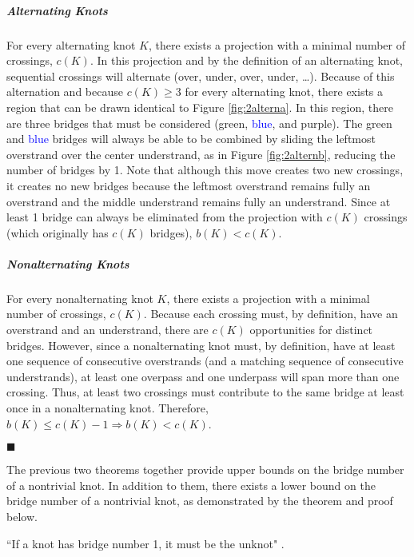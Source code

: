 \documentclass[titlepage]{article}
\newcommand{\dq}[4][]{``#2"#1 \cite[#4]{#3}.}
\newcommand{\qed}{
    \begin{flushright}
        $\blacksquare$
    \end{flushright}
}
\begin{document}
\subparagraph{\textbf{Alternating Knots}} For every alternating knot $K$, there exists a projection with a minimal number of crossings, $c(K)$. In this projection and by the definition of an alternating knot, sequential crossings will alternate (over, under, over, under, \dots). Because of this alternation and because $c(K)\geq 3$ for every alternating knot, there exists a region that can be drawn identical to Figure \ref{fig:2alterna}. In this region, there are three bridges that must be considered (\textcolor{grx}{green}, \textcolor{blue}{blue}, and \textcolor{pux}{purple}). The \textcolor{grx}{green} and \textcolor{blue}{blue} bridges will always be able to be combined by sliding the leftmost overstrand over the center understrand, as in Figure \ref{fig:2alternb}, reducing the number of bridges by 1. Note that although this move creates two new crossings, it creates no new bridges because the leftmost overstrand remains fully an overstrand and the middle understrand remains fully an understrand. Since at least 1 bridge can always be eliminated from the projection with $c(K)$ crossings (which originally has $c(K)$ bridges), $b(K)<c(K)$.
\subparagraph{\textbf{Nonalternating Knots}} For every nonalternating knot $K$, there exists a projection with a minimal number of crossings, $c(K)$. Because each crossing must, by definition, have an overstrand and an understrand, there are $c(K)$ opportunities for distinct bridges. However, since a nonalternating knot must, by definition, have at least one sequence of consecutive overstrands (and a matching sequence of consecutive understrands), at least one overpass and one underpass will span more than one crossing. Thus, at least two crossings must contribute to the same bridge at least once in a nonalternating knot. Therefore, $b(K)\leq c(K)-1\Rightarrow b(K)<c(K)$.
\qed

The previous two theorems together provide upper bounds on the bridge number of a nontrivial knot. In addition to them, there exists a lower bound on the bridge number of a nontrivial knot, as demonstrated by the theorem and proof below.

\begin{theor}
    \dq{If a knot has bridge number 1, it must be the unknot}{bib:knotbook}{65}
\end{theor}
\end{document}
